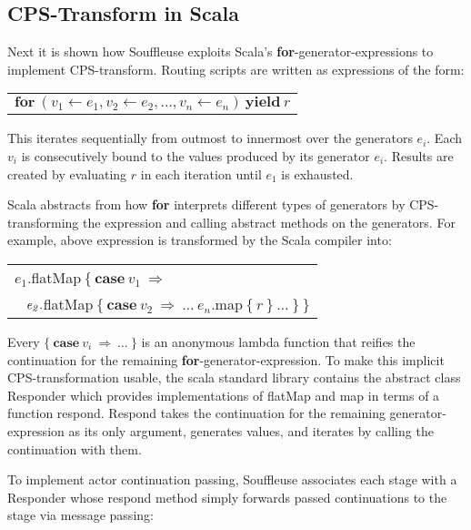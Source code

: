 \documentclass[preprint]{sigplanconf}
\begin{document}
       
\subsection{CPS-Transform in Scala}     

Next it is shown how Souffleuse exploits Scala's \textbf{for}-generator-expressions to implement
CPS-transform. Routing scripts are written as expressions of the form:

\medskip
{\footnotesize\begin{tabular}{l} $\mathbf{for}\ (\mathit{v_1} \leftarrow \mathit{e_1}, \mathit{v_2} \leftarrow
\mathit{e_2}, \ldots, \mathit{v_n} \leftarrow \mathit{e_n})\ \mathbf{yield}\ \mathit{r}$
\end{tabular}}
\medskip

This iterates sequentially from outmost to innermost over the generators $e_i$. Each $v_i$ is
consecutively bound to the values produced by its generator $e_i$. Results are created by evaluating
$r$ in each iteration until $e_1$ is exhausted.

Scala abstracts from how \textbf{for} interprets different types of generators by CPS-transforming
the expression and calling abstract methods on the generators. For example, above expression is
transformed by the Scala compiler into:

\medskip
{\footnotesize\begin{tabular}{l}
$\mathit{e_1}.$flatMap$\ \{\ \mathbf{case}\ \mathit{v_1}\ \Rightarrow$\\
$\hspace{2ex}\mathit{e_2}.$flatMap$\ \{\ \mathbf{case}\ \mathit{v_2}\ \Rightarrow\ \ldots\ \mathit{e_n}.$map$\ \{\ \mathit{r}\ \}\ \ldots\ \}\ \}$
\end{tabular}}
\medskip

Every $\{\ \mathbf{case}\ \mathit{v_i}\ \Rightarrow\ \ldots\ \}$ is an anonymous lambda function
that reifies the continuation for the remaining \textbf{for}-generator-expression. To make this
implicit CPS-transformation usable, the scala standard library contains the abstract class Responder
which provides implementations of flatMap and map in terms of a function respond. Respond takes the
continuation for the remaining generator-expression as its only argument, generates values, and
iterates by calling the continuation with them.

To implement actor continuation passing, Souffleuse associates each stage with a Responder whose
respond method simply forwards passed continuations to the stage via message passing:
                                                                                            
\end{document}
